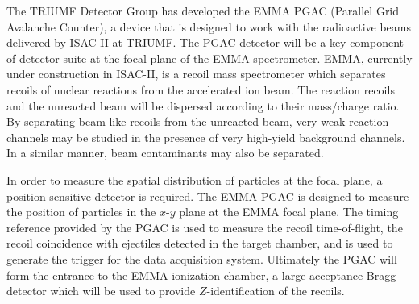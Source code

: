 The TRIUMF Detector Group has developed %
the EMMA PGAC (Parallel Grid Avalanche Counter), a device that is designed to work with the radioactive beams
delivered by ISAC-II at TRIUMF.  The PGAC detector will be a key component of  detector suite at the focal plane of the EMMA spectrometer.
EMMA, currently under construction in ISAC-II,  is a recoil mass spectrometer 
which %
 separates recoils of nuclear reactions from the accelerated ion beam.  The reaction recoils and the unreacted beam will be dispersed  according to their mass/charge ratio.  By separating beam-like recoils from the unreacted beam, very weak reaction channels may be studied in the presence of very high-yield background channels.  In a similar manner, beam contaminants may also be separated.  
 
In order to measure the spatial distribution of particles at the focal plane, a position sensitive detector is required.  The EMMA PGAC is designed to measure the position of particles in the $x$-$y$ plane at the EMMA focal plane. %
  The timing reference provided by the PGAC is used to measure the recoil time-of-flight, the recoil coincidence with ejectiles detected in the target chamber, and is used to generate the trigger for the data acquisition system.
Ultimately the PGAC will form the entrance to the EMMA ionization chamber, a large-acceptance Bragg detector which will be used to provide $Z$-identification of the  recoils.
 

